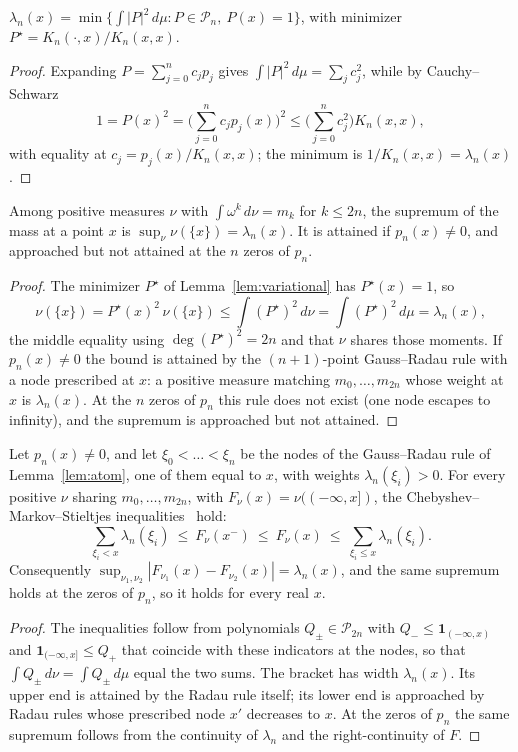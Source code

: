 \documentclass[submission, PhysCore]{SciPost}
\begin{document}
\begin{appendix}
\begin{applemma}\label{lem:variational}
$\lambda_n(x)=\min\{\int|P|^2\,d\mu : P\in\mathcal{P}_n,\ P(x)=1\}$, with minimizer $P^\star=K_n(\cdot,x)/K_n(x,x)$.
\end{applemma}
\begin{proof}
Expanding $P=\sum_{j=0}^{n}c_jp_j$ gives $\int|P|^2\,d\mu=\sum_j c_j^2$, while by Cauchy--Schwarz
\[
1=P(x)^2=\Big(\sum_{j=0}^{n}c_jp_j(x)\Big)^2\le\Big(\sum_{j=0}^{n}c_j^2\Big)K_n(x,x),
\]
with equality at $c_j=p_j(x)/K_n(x,x)$; the minimum is $1/K_n(x,x)=\lambda_n(x)$.
\end{proof}

\begin{applemma}\label{lem:atom}
Among positive measures $\nu$ with $\int\omega^k\,d\nu=m_k$ for $k\le 2n$, the supremum of the mass at a point $x$ is $\sup_\nu\nu(\{x\})=\lambda_n(x)$. It is attained if ${p_n(x)\neq0}$, and approached but not attained at the $n$ zeros of $p_n$.
\end{applemma}
\begin{proof}
The minimizer $P^\star$ of Lemma~\ref{lem:variational} has $P^\star(x)=1$, so
\[
\nu(\{x\})=P^\star(x)^2\,\nu(\{x\})\le\int (P^\star)^2\,d\nu=\int (P^\star)^2\,d\mu=\lambda_n(x),
\]
the middle equality using $\deg (P^\star)^2=2n$ and that $\nu$ shares those moments. If ${p_n(x)\neq0}$ the bound is attained by the $(n{+}1)$-point Gauss--Radau rule with a node prescribed at $x$: a positive measure matching $m_0,\dots,m_{2n}$ whose weight at $x$ is $\lambda_n(x)$. At the $n$ zeros of $p_n$ this rule does not exist (one node escapes to infinity), and the supremum is approached but not attained.
\end{proof}

\begin{applemma}\label{lem:gap}
Let ${p_n(x)\neq0}$, and let $\xi_0<\dots<\xi_n$ be the nodes of the Gauss--Radau rule of Lemma~\ref{lem:atom}, one of them equal to $x$, with weights $\lambda_n(\xi_i)>0$. For every positive $\nu$ sharing $m_0,\dots,m_{2n}$, with $F_\nu(x)=\nu((-\infty,x])$, the Chebyshev--Markov--Stieltjes inequalities~\cite{Akhiezer1965,KreinNudelman1977,KarlinStudden1966,DetteStudden1997} hold:
\[
\textstyle\sum_{\xi_i<x}\lambda_n(\xi_i)\ \le\ F_\nu(x^-)\ \le\ F_\nu(x)\ \le\ \sum_{\xi_i\le x}\lambda_n(\xi_i).
\]
Consequently $\sup_{\nu_1,\nu_2}|F_{\nu_1}(x)-F_{\nu_2}(x)|=\lambda_n(x)$, and the same supremum holds at the zeros of $p_n$, so it holds for every real $x$.
\end{applemma}
\begin{proof}
The inequalities follow from polynomials $Q_\pm\in\mathcal{P}_{2n}$ with $Q_-\le\mathbf{1}_{(-\infty,x)}$ and $\mathbf{1}_{(-\infty,x]}\le Q_+$ that coincide with these indicators at the nodes, so that $\int Q_\pm\,d\nu=\int Q_\pm\,d\mu$ equal the two sums. The bracket has width $\lambda_n(x)$. Its upper end is attained by the Radau rule itself; its lower end is approached by Radau rules whose prescribed node $x'$ decreases to $x$. At the zeros of $p_n$ the same supremum follows from the continuity of $\lambda_n$ and the right-continuity of $F$.
\end{proof}


\end{appendix}
\end{document}
